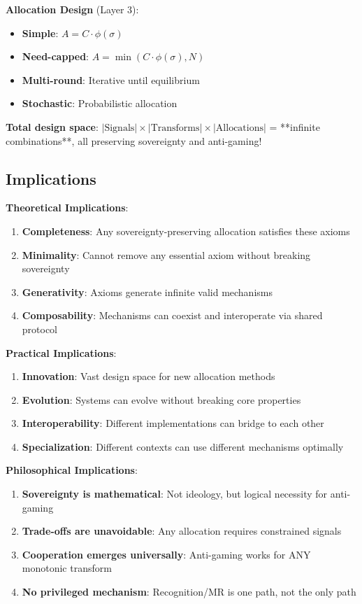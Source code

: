 \documentclass[11pt,a4paper]{article}
\theoremstyle{definition}
\theoremstyle{remark}
\begin{document}
\textbf{Allocation Design} (Layer 3):
\begin{itemize}
\item \textbf{Simple}: $A = C \cdot \phi(\sigma)$
\item \textbf{Need-capped}: $A = \min(C \cdot \phi(\sigma), N)$
\item \textbf{Multi-round}: Iterative until equilibrium
\item \textbf{Stochastic}: Probabilistic allocation
\end{itemize}

\textbf{Total design space}: $|\text{Signals}| \times |\text{Transforms}| \times |\text{Allocations}|$ = **infinite combinations**, all preserving sovereignty and anti-gaming!

\subsection{Implications}

\textbf{Theoretical Implications}:
\begin{enumerate}
\item \textbf{Completeness}: Any sovereignty-preserving allocation satisfies these axioms
\item \textbf{Minimality}: Cannot remove any essential axiom without breaking sovereignty
\item \textbf{Generativity}: Axioms generate infinite valid mechanisms
\item \textbf{Composability}: Mechanisms can coexist and interoperate via shared protocol
\end{enumerate}

\textbf{Practical Implications}:
\begin{enumerate}
\item \textbf{Innovation}: Vast design space for new allocation methods
\item \textbf{Evolution}: Systems can evolve without breaking core properties
\item \textbf{Interoperability}: Different implementations can bridge to each other
\item \textbf{Specialization}: Different contexts can use different mechanisms optimally
\end{enumerate}

\textbf{Philosophical Implications}:
\begin{enumerate}
\item \textbf{Sovereignty is mathematical}: Not ideology, but logical necessity for anti-gaming
\item \textbf{Trade-offs are unavoidable}: Any allocation requires constrained signals
\item \textbf{Cooperation emerges universally}: Anti-gaming works for ANY monotonic transform
\item \textbf{No privileged mechanism}: Recognition/MR is one path, not the only path
\end{enumerate}
\end{document}
